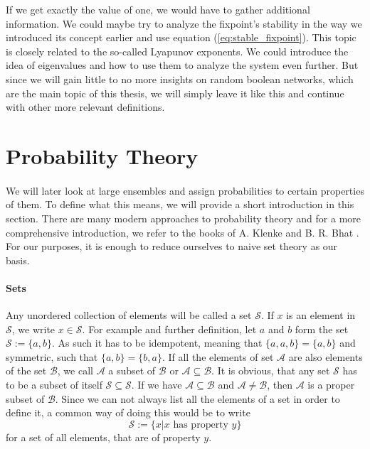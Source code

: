If we get exactly the value of one, we would have to gather additional information. We could maybe try to analyze the fixpoint's stability in the way we introduced its concept earlier and use equation (\ref{eq:stable_fixpoint}). This topic is closely related to the so-called Lyapunov exponents. We could introduce the idea of eigenvalues and how to use them to analyze the system even further. But since we will gain little to no more insights on random boolean networks, which are the main topic of this thesis, we will simply leave it like this and continue with other more relevant definitions.

\section{Probability Theory}
\paragraph*{}
We will later look at large ensembles and assign probabilities to certain properties of them. To define what this means, we will provide a short introduction in this section. There are many modern approaches to probability theory and for a more comprehensive introduction, we refer to the books of  A. Klenke \cite{klenke2013probability} and B. R. Bhat \cite{bhat2007modern}. For our purposes, it is enough to reduce ourselves to naive set theory as our basis.

\paragraph*{Sets}
Any unordered collection of elements will be called a set $\mathcal{S}$. If $x$ is an element in $\mathcal{S}$, we write $x\in \mathcal{S}$. For example and further definition, let $a$ and $b$ form the set $\mathcal{S}:=\{a,b\}$. As such it has to be idempotent, meaning that $\{a,a,b\} = \{a,b\}$ and symmetric, such that $\{a,b\} = \{b,a\}$. If all the elements of set $\mathcal{A}$ are also elements of the set $\mathcal{B}$, we call $\mathcal{A}$ a subset of $\mathcal{B}$ or $\mathcal{A}\subseteq\mathcal{B}$. It is obvious, that any set $\mathcal{S}$  has to be a subset of itself $\mathcal{S}\subseteq\mathcal{S}$. If we have $\mathcal{A}\subseteq\mathcal{B}$ and $\mathcal{A}\neq\mathcal{B}$, then $\mathcal{A}$ is a proper subset of $\mathcal{B}$. Since we can not always list all the elements of a set in order to define it, a common way of doing this would be to write 
\begin{equation}
\mathcal{S}:=\{x|x\text{ has property }y\}
\end{equation}
for a set of all elements, that are of property $y$.

